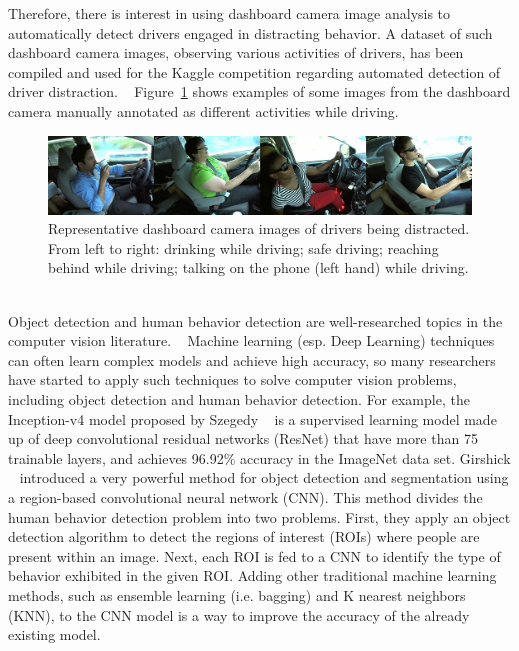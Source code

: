 \documentclass[conference,compsoc]{IEEEtran}
\makeatletter
\def\fixFloatSize#1{}%
\makeatother
\begin{document}
  Therefore, there is interest in using dashboard camera image analysis to automatically detect drivers engaged in distracting behavior. A dataset of such dashboard camera images, observing various activities of drivers, has been compiled and used for the Kaggle competition regarding automated detection of driver distraction. \unskip~\cite{1641075:26775858} Figure~\ref{Drive-Net/figure1} shows examples of some images from the dashboard camera manually annotated as different activities while driving.


\bgroup
\fixFloatSize{Drive-Net/figures/image1.jpeg}
\begin{figure}[!htbp]
\centering 
\includegraphics{Drive-Net/figures/image1.jpeg}
\caption{Representative dashboard camera images of drivers being distracted. From left to right: drinking while driving; safe driving; reaching behind while driving; talking on the phone (left hand) while driving. \unskip~\protect\cite{1641075:26775858}}
\label{Drive-Net/figure1}
\end{figure}
\egroup

Object detection and human behavior detection are well-researched topics in the computer vision literature. \unskip~\cite{1641075:26775854} Machine learning (esp. Deep Learning) techniques can often learn complex models and achieve high accuracy, so many researchers have started to apply such techniques to solve computer vision problems, including object detection and human behavior detection. For example, the Inception-v4 model proposed by Szegedy \unskip~\cite{1641075:26775859} is a supervised learning model made up of deep convolutional residual networks (ResNet) that have more than 75 trainable layers, and achieves 96.92\% accuracy in the ImageNet data set. Girshick \unskip~\cite{1641075:26775856} introduced a very powerful method for object detection and segmentation using a region-based convolutional neural network (CNN). This method divides the human behavior detection problem into two problems. First, they apply an object detection algorithm to detect the regions of interest (ROIs) where people are present within an image. Next, each ROI is fed to a CNN to identify the type of behavior exhibited in the given ROI. Adding other traditional machine learning methods, such as ensemble learning (i.e. bagging) and K nearest neighbors (KNN), to the CNN model is a way to improve the accuracy of the already existing model. \unskip~\cite{1641075:26775847}
\end{document}
